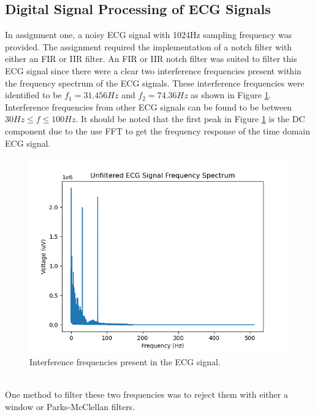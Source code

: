 \documentclass[a4paper, 11pt]{article}
\begin{document}
    \subsection{Digital Signal Processing of ECG Signals}\label{sec:bg_sub1}
        In assignment one, a noisy ECG signal with 1024Hz sampling frequency was provided. 
        The assignment required the implementation of a notch filter with either an FIR or IIR filter.
        An FIR or IIR notch filter was suited to filter this ECG signal since there were a clear two 
        interference frequencies present within the frequency spectrum of the ECG signals.
        These interference frequencies were identified to be $f_{1} = 31.456Hz$ and $f_{2} = 74.36Hz$
        as shown in Figure \ref{Fig:rejFreq}. Interference frequencies from other ECG signals can be found to
        be between $30Hz \leqslant f \leqslant 100Hz$. It should be noted that the first peak in Figure \ref{Fig:rejFreq} is the 
        DC component due to the use FFT to get the frequency response of the time domain ECG signal.
        \\
        \begin{figure}[h!]
            \centering
            \graphicspath{{./wiki/}}
            \includegraphics[scale=0.6]{ECG_freq_spectrum.png}
            \caption{Interference frequencies present in the ECG signal.}
            \label{Fig:rejFreq}
        \end{figure}
        \\
        One method to filter these two frequencies was to reject them with either a window or Parks-McClellan filters.
\end{document}
